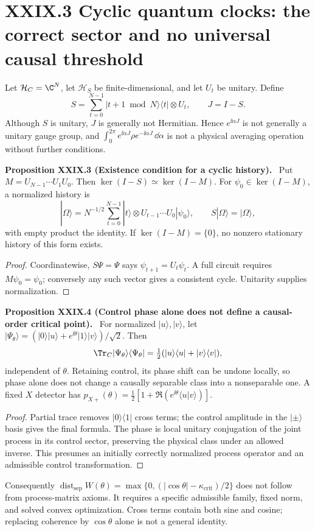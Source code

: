 \documentclass[11pt,a4paper,oneside]{book}
\newcommand{\statement}[3]{\par\medskip\noindent\textbf{#1 #2 (#3).}\ }
\begin{document}
\section*{XXIX.3 Cyclic quantum clocks: the correct sector and no universal causal threshold}
Let $\mathcal H_C=\C^N$, let $\mathcal H_S$ be finite-dimensional, and let $U_t$ be unitary. Define
\[S=\sum_{t=0}^{N-1}|t+1\bmod N\rangle\langle t|\otimes U_t,\qquad J=I-S.\]
Although $S$ is unitary, $J$ is generally not Hermitian. Hence $e^{\ii\alpha J}$ is not generally a unitary gauge group, and $\int_0^{2\pi}e^{\ii\alpha J}\rho e^{-\ii\alpha J}\,\dd\alpha$ is not a physical averaging operation without further conditions.
\statement{Proposition}{XXIX.3}{Existence condition for a cyclic history} Put $M=U_{N-1}\cdots U_1U_0$. Then $\ker(I-S)\simeq\ker(I-M)$. For $\psi_0\in\ker(I-M)$, a normalized history is
\[|\Omega\rangle=N^{-1/2}\sum_{t=0}^{N-1}|t\rangle\otimes U_{t-1}\cdots U_0|\psi_0\rangle,\qquad S|\Omega\rangle=|\Omega\rangle,\]
with empty product the identity. If $\ker(I-M)=\{0\}$, no nonzero stationary history of this form exists.
\begin{proof}Coordinatewise, $S\Psi=\Psi$ says $\psi_{t+1}=U_t\psi_t$. A full circuit requires $M\psi_0=\psi_0$; conversely any such vector gives a consistent cycle. Unitarity supplies normalization.\end{proof}
\statement{Proposition}{XXIX.4}{Control phase alone does not define a causal-order critical point} For normalized $|u\rangle,|v\rangle$, let $|\Psi_\theta\rangle=(|0\rangle|u\rangle+e^{\ii\theta}|1\rangle|v\rangle)/\sqrt2$. Then
\[\Tr_C|\Psi_\theta\rangle\langle\Psi_\theta|=\tfrac12(|u\rangle\langle u|+|v\rangle\langle v|),\]
independent of $\theta$. Retaining control, its phase shift can be undone locally, so phase alone does not change a causally separable class into a nonseparable one. A fixed $X$ detector has $p_{X+}(\theta)=\frac12[1+\Re(e^{\ii\theta}\langle u|v\rangle)]$.
\begin{proof}Partial trace removes $|0\rangle\langle1|$ cross terms; the control amplitude in the $|\pm\rangle$ basis gives the final formula. The phase is local unitary conjugation of the joint process in its control sector, preserving the physical class under an allowed inverse. This presumes an initially correctly normalized process operator and an admissible control transformation.\end{proof}
Consequently $\operatorname{dist}_{\mathrm{sep}}W(\theta)=\max\{0,(|\cos\theta|-\kappa_{\mathrm{crit}})/2\}$ does not follow from process-matrix axioms. It requires a specific admissible family, fixed norm, and solved convex optimization. Cross terms contain both sine and cosine; replacing coherence by $\cos\theta$ alone is not a general identity.
\end{document}
